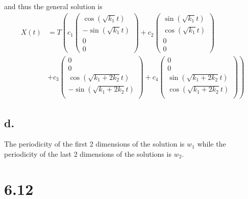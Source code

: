 \documentclass[11pt]{article}
\theoremstyle{mystyle}
\theoremstyle{definition}
\begin{document}
and thus the general solution is 
\begin{align*}
  X(t) &= T \left( 
  c_1 
  \begin{pmatrix}
    \cos(\sqrt{k_1}t) \\
    -\sin(\sqrt{k_1}t) \\
    0 \\
    0
  \end{pmatrix} +
  c_2
  \begin{pmatrix}
    \sin(\sqrt{k_1}t) \\
    \cos(\sqrt{k_1}t) \\
    0 \\ 
    0
  \end{pmatrix} \right. \\
  &+ 
  c_3
  \left.
  \begin{pmatrix}
    0 \\
    0 \\
    \cos(\sqrt{k_1 + 2k_2}t) \\
    -\sin(\sqrt{k_1 + 2k_2}t) \\
  \end{pmatrix} +
  c_4
  \begin{pmatrix}
    0 \\
    0 \\
    \sin(\sqrt{k_1 + 2k_2}t) \\
    \cos(\sqrt{k_1 + 2k_2}t) \\
  \end{pmatrix}
  \right)
\end{align*}
\subsection*{d.}
The periodicity of the first 2 dimensions of the solution is $w_1$ while the periodicity of the last 2 dimensions of the solutions is $w_2$. 
\clearpage
\section*{6.12}
\end{document}
